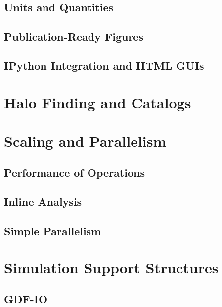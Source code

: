 \documentclass{emulateapj}
\begin{document}
\subsection{Units and Quantities}


\subsection{Publication-Ready Figures}


\subsection{IPython Integration and HTML GUIs}


\section{Halo Finding and Catalogs}


\section{Scaling and Parallelism}


\subsection{Performance of Operations}


\subsection{Inline Analysis}


\subsection{Simple Parallelism}


\section{Simulation Support Structures}


\subsection{GDF-IO}

\end{document}
